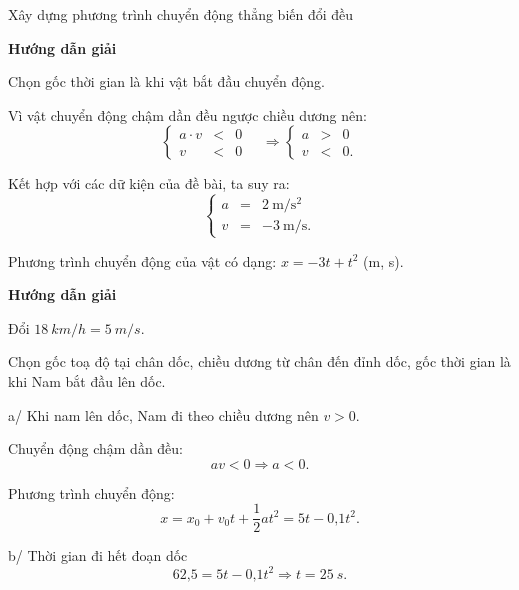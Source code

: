 \begin{dang}{Xây dựng phương trình chuyển động thẳng biến đổi đều}
	{	\begin{center}
			\textbf{Hướng dẫn giải}
		\end{center}
		
		Chọn gốc thời gian là khi vật bắt đầu chuyển động.
		
		Vì vật chuyển động chậm dần đều ngược chiều dương nên:
		\begin{equation*}
			\left\{
			\begin{array}{rcl}
				a\cdot v &<&0\\
				v &<& 0
			\end{array}
			\right.
			\quad
			\Rightarrow 
			\left\{
			\begin{array}{rcl}
				a &>& 0\\
				v &<& 0.
			\end{array}
			\right.
		\end{equation*}
		
		Kết hợp với các dữ kiện của đề bài, ta suy ra:
		\begin{equation*}
			\left\{
			\begin{array}{rcr}
				a&=&\SI{2}{\meter/\second^2}\\
				v&=&\SI{-3}{\meter/\second} .
			\end{array}
			\right.
		\end{equation*}
		
		Phương trình chuyển động của vật có dạng:
		$x=-3t+t^2$ (m, s).
	}
	{	\begin{center}
			\textbf{Hướng dẫn giải}
		\end{center}
		
		Đổi $\SI{18}{km/h} = \SI{5}{m/s}$.
		
		Chọn gốc toạ độ tại chân dốc, chiều dương từ chân đến đỉnh dốc, gốc thời gian là khi Nam bắt đầu lên dốc.
		
		a/ Khi nam lên dốc, Nam đi theo chiều dương nên $v>0$.
		
		Chuyển động chậm dần đều: 
		$$av<0 \Rightarrow a<0.$$
		
		Phương trình chuyển động:
		$$x =x_0 +v_0t+\dfrac{1}{2}at^2 = 5t - \text{0,1}t^2.$$
		
		b/ Thời gian đi hết đoạn dốc
		$$\text{62,5} =5t - \text{0,1}t^2 \Rightarrow t = \SI{25}{s}.$$
	}
\end{dang}

